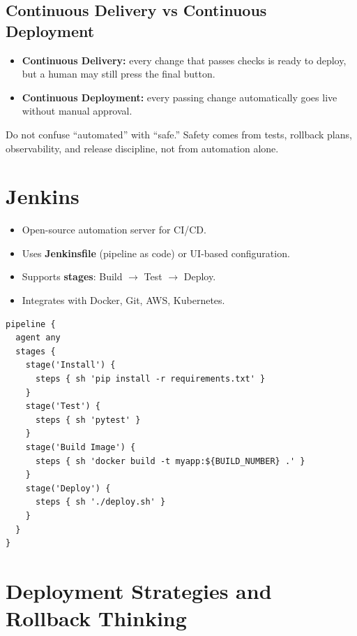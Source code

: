 \documentclass[12pt, a4paper, oneside]{book}
\begin{document}
\subsection{Continuous Delivery vs Continuous Deployment}

\begin{itemize}[leftmargin=2em]
    \item \textbf{Continuous Delivery:} every change that passes checks is ready to deploy, but a human may still press the final button.
    \item \textbf{Continuous Deployment:} every passing change automatically goes live without manual approval.
\end{itemize}

\begin{warningbox}
Do not confuse ``automated'' with ``safe.'' Safety comes from tests, rollback plans, observability, and release discipline, not from automation alone.
\end{warningbox}

\section{Jenkins}
\begin{itemize}[leftmargin=2em]
    \item Open-source automation server for CI/CD.
    \item Uses \textbf{Jenkinsfile} (pipeline as code) or UI-based configuration.
    \item Supports \textbf{stages}: Build $\to$ Test $\to$ Deploy.
    \item Integrates with Docker, Git, AWS, Kubernetes.
\end{itemize}

\begin{lstlisting}[caption={Conceptual Jenkins pipeline}]
pipeline {
  agent any
  stages {
    stage('Install') {
      steps { sh 'pip install -r requirements.txt' }
    }
    stage('Test') {
      steps { sh 'pytest' }
    }
    stage('Build Image') {
      steps { sh 'docker build -t myapp:${BUILD_NUMBER} .' }
    }
    stage('Deploy') {
      steps { sh './deploy.sh' }
    }
  }
}
\end{lstlisting}

\section{Deployment Strategies and Rollback Thinking}
\end{document}

